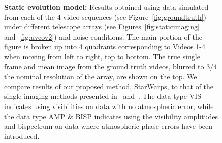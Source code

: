 \begin{figure}
\begin{center}
		\caption{{\bf Static evolution model:} Results obtained using data simulated from each of the 4 video sequences (see Figure~\ref{fig:groundtruth}) under different telescope arrays (see Figures~\ref{fig:staticimaging} and~\ref{fig:uvcov2}) and noise conditions. The main portion of the figure is broken up into 4 quadrants corresponding to Videos 1-4 when moving from left to right, top to bottom. The true single frame and mean image from the ground truth videos, blurred to 3/4 the nominal resolution of the array, are shown on the top. We compare results of our proposed method, StarWarps, to that of the single imaging methods presented in~\cite{freek} and~\cite{andrew}. The data type VIS indicates using visibilities on data with no atmospheric error, while the data type AMP \& BISP indicates using the visibility amplitudes and bispectrum on data where atmospheric phase errors have been introduced. }
		\label{fig:staticevolutionresults}
	\end{center}
\end{figure}



























































